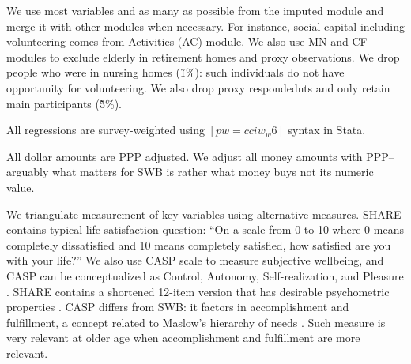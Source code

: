 \documentclass[10pt, letterpaper]{article}
\begin{document}
\begin{spacing}{1.4}
We use most variables and as many as possible from the  imputed module and merge
it with other modules when necessary. For instance, social capital including
volunteering comes from Activities (AC) module. We also use MN and CF modules to
exclude elderly in retirement homes and proxy observations.
%
We drop people who were in nursing homes (\~ 1\%): such individuals do not have
opportunity for volunteering. We also drop proxy respondednts and only retain
main participants (\~ 5\%). %


All regressions are survey-weighted using $[pw=cciw_w6]$ syntax in Stata.

All dollar amounts are PPP adjusted. We adjust all money amounts with
PPP--arguably what matters for SWB is rather what money buys not its numeric value.

We triangulate measurement of key variables using alternative  measures. 
SHARE contains typical life satisfaction question: %
``On a scale from 0 to 10 where 0 means completely dissatisfied and 10 means
completely satisfied, how satisfied
are you with your life?'' We also use CASP scale to measure subjective
wellbeing, and CASP can be conceptualized as Control, Autonomy,
Self-realization, and Pleasure \citep{hyde2003measure}. SHARE contains a shortened 12-item version that has
desirable psychometric properties \citep{knesbeck2005quality}. CASP differs from
SWB: it factors in accomplishment and fulfillment, a concept related to Maslow's
hierarchy of needs \citep{maslow87}. Such measure is  very relevant at older age
when accomplishment and fulfillment are more relevant. %


\end{spacing}
\end{document}
